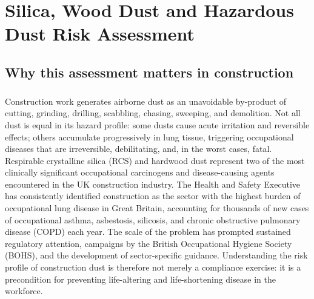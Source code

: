 \chapter{Silica, Wood Dust and Hazardous Dust Risk Assessment}
\label{chap:Silica, Wood Dust and Hazardous Dust Risk Assessment}

\section{Why this assessment matters in construction}

\paragraph{}
Construction work generates airborne dust as an unavoidable by-product of cutting, grinding, drilling, scabbling, chasing, sweeping, and demolition. Not all dust is equal in its hazard profile: some dusts cause acute irritation and reversible effects; others accumulate progressively in lung tissue, triggering occupational diseases that are irreversible, debilitating, and, in the worst cases, fatal. Respirable crystalline silica (RCS) and hardwood dust represent two of the most clinically significant occupational carcinogens and disease-causing agents encountered in the UK construction industry. The Health and Safety Executive has consistently identified construction as the sector with the highest burden of occupational lung disease in Great Britain, accounting for thousands of new cases of occupational asthma, asbestosis, silicosis, and chronic obstructive pulmonary disease (COPD) each year. The scale of the problem has prompted sustained regulatory attention, campaigns by the British Occupational Hygiene Society (BOHS), and the development of sector-specific guidance. Understanding the risk profile of construction dust is therefore not merely a compliance exercise: it is a precondition for preventing life-altering and life-shortening disease in the workforce.


